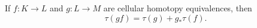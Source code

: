 If $f: K \rightarrow L$ and $g: L \rightarrow M$ are cellular homotopy equivalences, then
$$\tau(gf) = \tau(g) + g_* \tau(f).$$
